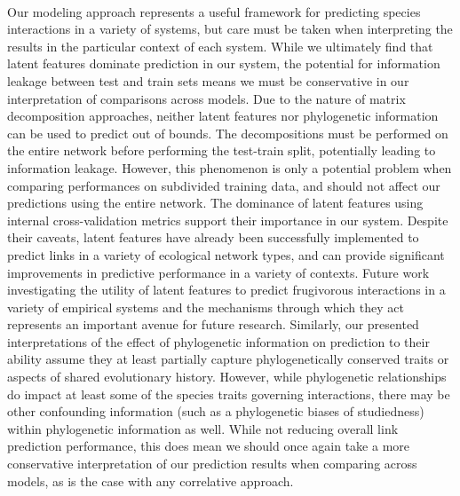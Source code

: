 \documentclass[num-refs]{wiley-article}%
\begin{document}
\paragraph*{} Our modeling approach represents a useful framework for predicting species interactions in a variety of systems, but care must be taken when interpreting the results in the particular context of each system. While we ultimately find that latent features dominate prediction in our system, the potential for information leakage between test and train sets means we must be conservative in our interpretation of comparisons across models. Due to the nature of matrix decomposition approaches, neither latent features nor phylogenetic information can be used to predict out of bounds. The decompositions must be performed on the entire network before performing the test-train split, potentially leading to information leakage. However, this phenomenon is only a potential problem when comparing performances on subdivided training data, and should not affect our predictions using the entire network. The dominance of latent features using internal cross-validation metrics support their importance in our system. Despite their caveats, latent features have already been successfully implemented to predict links in a variety of ecological network types, and can provide significant improvements in predictive performance in a variety of contexts.\cite{banville2023constrains, poisot2021imputing, poisot2023network, nunes2024estimated} Future work investigating the utility of latent features to predict frugivorous interactions in a variety of empirical systems and the mechanisms through which they act represents an important avenue for future research.  Similarly, our presented interpretations of the effect of phylogenetic information on prediction to their ability assume they at least partially capture phylogenetically conserved traits  or aspects of shared evolutionary history. However, while phylogenetic relationships do impact at least some of the species traits governing interactions, there may be other confounding information (such as a phylogenetic  biases of studiedness) within phylogenetic information as well. While not reducing overall link prediction performance, this does mean we should once again take a more conservative interpretation of our prediction results when comparing across models, as is the case with any correlative approach. 
\end{document}
